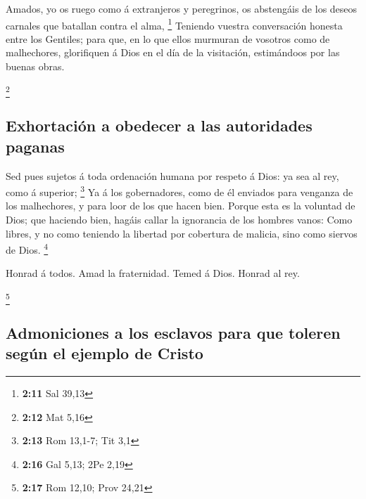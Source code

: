  Amados, yo os ruego como á extranjeros y peregrinos, os
abstengáis de los deseos carnales que batallan contra el alma,
\footnote{\textbf{2:11} Sal 39,13}  Teniendo vuestra
conversación honesta entre los Gentiles; para que, en lo que ellos
murmuran de vosotros como de malhechores, glorifiquen á Dios en el día
de la visitación, estimándoos por las buenas obras.

\footnote{\textbf{2:12} Mat 5,16}

\hypertarget{exhortaciuxf3n-a-obedecer-a-las-autoridades-paganas}{%
\subsection{Exhortación a obedecer a las autoridades
paganas}\label{exhortaciuxf3n-a-obedecer-a-las-autoridades-paganas}}

 Sed pues sujetos á toda ordenación humana por respeto á
Dios: ya sea al rey, como á superior; \footnote{\textbf{2:13} Rom
  13,1-7; Tit 3,1}  Ya á los gobernadores, como de él
enviados para venganza de los malhechores, y para loor de los que hacen
bien.  Porque esta es la voluntad de Dios; que haciendo
bien, hagáis callar la ignorancia de los hombres vanos: 
Como libres, y no como teniendo la libertad por cobertura de malicia,
sino como siervos de Dios. \footnote{\textbf{2:16} Gal 5,13; 2Pe 2,19}

 Honrad á todos. Amad la fraternidad. Temed á Dios.
Honrad al rey.

\footnote{\textbf{2:17} Rom 12,10; Prov 24,21}

\hypertarget{admoniciones-a-los-esclavos-para-que-toleren-seguxfan-el-ejemplo-de-cristo}{%
\subsection{Admoniciones a los esclavos para que toleren según el
ejemplo de
Cristo}\label{admoniciones-a-los-esclavos-para-que-toleren-seguxfan-el-ejemplo-de-cristo}}

